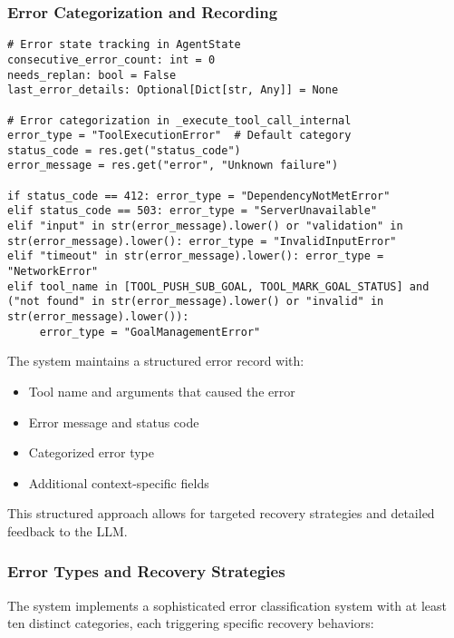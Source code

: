 \documentclass[12pt,a4paper]{article}
\begin{document}
\subsubsection*{Error Categorization and Recording}
\begin{pageablecode}
\begin{verbatim}
# Error state tracking in AgentState
consecutive_error_count: int = 0
needs_replan: bool = False
last_error_details: Optional[Dict[str, Any]] = None

# Error categorization in _execute_tool_call_internal
error_type = "ToolExecutionError"  # Default category
status_code = res.get("status_code")
error_message = res.get("error", "Unknown failure")

if status_code == 412: error_type = "DependencyNotMetError"
elif status_code == 503: error_type = "ServerUnavailable"
elif "input" in str(error_message).lower() or "validation" in str(error_message).lower(): error_type = "InvalidInputError"
elif "timeout" in str(error_message).lower(): error_type = "NetworkError"
elif tool_name in [TOOL_PUSH_SUB_GOAL, TOOL_MARK_GOAL_STATUS] and ("not found" in str(error_message).lower() or "invalid" in str(error_message).lower()):
     error_type = "GoalManagementError"
\end{verbatim}
\end{pageablecode}
The system maintains a structured error record with:
\begin{itemize}
    \item Tool name and arguments that caused the error
    \item Error message and status code
    \item Categorized error type
    \item Additional context-specific fields
\end{itemize}

This structured approach allows for targeted recovery strategies and detailed feedback to the LLM.

\subsubsection*{Error Types and Recovery Strategies}

The system implements a sophisticated error classification system with at least ten distinct categories, each triggering specific recovery behaviors:
\end{document}
